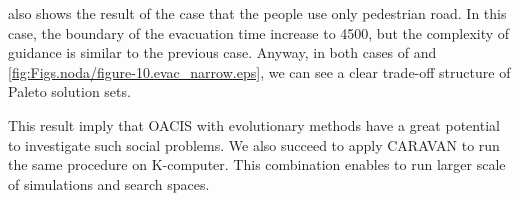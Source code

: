  also
shows the result of the case that the people use only pedestrian road.
In this case, the boundary of the evacuation time increase to 4500,
but the complexity of guidance is similar to the previous case.
Anyway, in both cases of  and
\ref{fig:Figs.noda/figure-10.evac_narrow.eps},
we can see a clear trade-off structure of Paleto solution sets.

This result imply that
OACIS with evolutionary methods have a great potential
to investigate such social problems.
We also succeed to apply CARAVAN to run the same procedure
on K-computer.
This combination enables to run larger scale of simulations
and search spaces.


